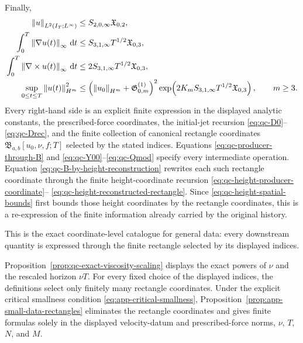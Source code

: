 {\begin{theorem}
Finally,
\begin{align}
 \left\lVert u\right\rVert_{L^2(I_T;L^\infty)}
 &\le S_{2,0,\infty}\mathfrak X_{0,2},
 \label{eq:qc-sharp-L2Linfty}\\
 \int_0^T\left\lVert \nabla u(t)\right\rVert_\infty\,\mathrm d t
 &\le S_{3,1,\infty}T^{1/2}\mathfrak X_{0,3},
 \label{eq:qc-sharp-lipschitz-action}\\
 \int_0^T\left\lVert \nabla\times u(t)\right\rVert_\infty\,\mathrm d t
 &\le2S_{3,1,\infty}T^{1/2}\mathfrak X_{0,3},
 \label{eq:qc-sharp-vorticity-action}\\
 \sup_{0\le t\le T}\left\lVert u(t)\right\rVert_{H^m}^2
 &\le\left(\left\lVert u_0\right\rVert_{H^m}+\mathfrak G^{(1)}_{0,m}\right)^2
 \exp\!\left(
 2K_mS_{3,1,\infty}T^{1/2}\mathfrak X_{0,3}
 \right),
 \qquad m\ge3.
 \label{eq:qc-sharp-continuation-growth}
\end{align}
Every right-hand side is an explicit finite expression in the displayed
analytic constants, the prescribed-force coordinates, the initial-jet recursion
\eqref{eq:qc-D0}--\eqref{eq:qc-Drec}, and the finite collection of canonical
rectangle coordinates \(\mathfrak B_{a,b}[u_0,\nu,f;T]\) selected by the stated
indices.  Equations \eqref{eq:qc-producer-through-B} and
\eqref{eq:qc-Y00}--\eqref{eq:qc-Qmod} specify every intermediate operation.
Equation \eqref{eq:qc-B-by-height-reconstruction} rewrites each such rectangle
coordinate through the finite height-coordinate recursion
\eqref{eq:qc-height-producer-coordinate}--%
\eqref{eq:qc-height-reconstructed-rectangle}.  Since
\eqref{eq:qc-height-spatial-bounds} first bounds those height coordinates by
the rectangle coordinates, this is a re-expression of the finite information
already carried by the original history.
\begin{samepage}
This is the exact coordinate-level catalogue for general data: every
downstream quantity is expressed through the finite rectangle selected by its
displayed indices.\par
\end{samepage}
Proposition~\ref{prop:qc-exact-viscosity-scaling} displays the exact powers of
\(\nu\) and the rescaled horizon \(\nu T\).  For every fixed choice of the
displayed indices, the definitions select only finitely many rectangle
coordinates.
Under the explicit critical smallness condition
\eqref{eq:app-critical-smallness}, Proposition~\ref{prop:app-small-data-rectangles}
eliminates the rectangle coordinates and gives finite formulas solely in the
displayed velocity-datum and prescribed-force norms, \(\nu\), \(T\),
\(N\), and \(M\).
\end{theorem}

}

